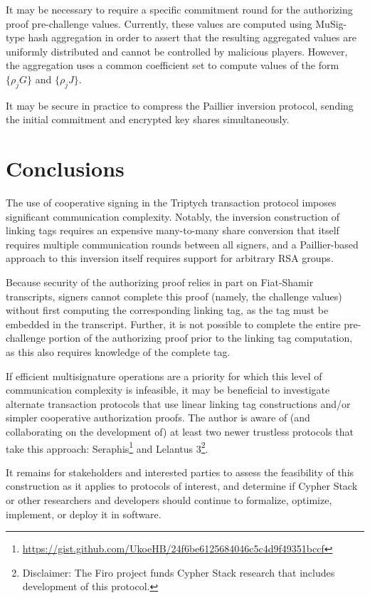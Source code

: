 \documentclass{article}
\begin{document}
It may be necessary to require a specific commitment round for the authorizing proof pre-challenge values.
Currently, these values are computed using MuSig-type hash aggregation in order to assert that the resulting aggregated values are uniformly distributed and cannot be controlled by malicious players.
However, the aggregation uses a common coefficient set to compute values of the form $\{\rho_j G\}$ and $\{\rho_j J\}$.

It may be secure in practice to compress the Paillier inversion protocol, sending the initial commitment and encrypted key shares simultaneously.


\section{Conclusions}

The use of cooperative signing in the Triptych transaction protocol imposes significant communication complexity.
Notably, the inversion construction of linking tags requires an expensive many-to-many share conversion that itself requires multiple communication rounds between all signers, and a Paillier-based approach to this inversion itself requires support for arbitrary RSA groups.

Because security of the authorizing proof relies in part on Fiat-Shamir transcripts, signers cannot complete this proof (namely, the challenge values) without first computing the corresponding linking tag, as the tag must be embedded in the transcript.
Further, it is not possible to complete the entire pre-challenge portion of the authorizing proof prior to the linking tag computation, as this also requires knowledge of the complete tag.

If efficient multisignature operations are a priority for which this level of communication complexity is infeasible, it may be beneficial to investigate alternate transaction protocols that use linear linking tag constructions and/or simpler cooperative authorization proofs.
The author is aware of (and collaborating on the development of) at least two newer trustless protocols that take this approach: Seraphis\footnote{\url{https://gist.github.com/UkoeHB/24f6be6125684046c5c4d9f49351bccf}} and Lelantus 3\footnote{Disclaimer: The Firo project funds Cypher Stack research that includes development of this protocol.}.

It remains for stakeholders and interested parties to assess the feasibility of this construction as it applies to protocols of interest, and determine if Cypher Stack or other researchers and developers should continue to formalize, optimize, implement, or deploy it in software.




\end{document}
